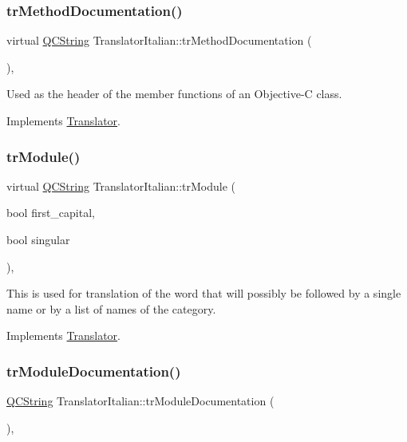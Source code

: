 \subsubsection{\texorpdfstring{trMethodDocumentation()}{trMethodDocumentation()}}
{\footnotesize\ttfamily virtual \mbox{\hyperlink{class_q_c_string}{Q\+C\+String}} Translator\+Italian\+::tr\+Method\+Documentation (\begin{DoxyParamCaption}{ }\end{DoxyParamCaption})\hspace{0.3cm}{\ttfamily [inline]}, {\ttfamily [virtual]}}

Used as the header of the member functions of an Objective-\/C class. 

Implements \mbox{\hyperlink{class_translator}{Translator}}.

\mbox{\label{class_translator_italian_aa4abaf98353a3cd4dde1fe30e1bd3f60}} 
\subsubsection{\texorpdfstring{trModule()}{trModule()}}
{\footnotesize\ttfamily virtual \mbox{\hyperlink{class_q_c_string}{Q\+C\+String}} Translator\+Italian\+::tr\+Module (\begin{DoxyParamCaption}\item[{bool}]{first\+\_\+capital,  }\item[{bool}]{singular }\end{DoxyParamCaption})\hspace{0.3cm}{\ttfamily [inline]}, {\ttfamily [virtual]}}

This is used for translation of the word that will possibly be followed by a single name or by a list of names of the category. 

Implements \mbox{\hyperlink{class_translator}{Translator}}.

\mbox{\label{class_translator_italian_a329af69d2c37dc2f4299ca6ee24442e6}} 
\subsubsection{\texorpdfstring{trModuleDocumentation()}{trModuleDocumentation()}}
{\footnotesize\ttfamily \mbox{\hyperlink{class_q_c_string}{Q\+C\+String}} Translator\+Italian\+::tr\+Module\+Documentation (\begin{DoxyParamCaption}{ }\end{DoxyParamCaption})\hspace{0.3cm}{\ttfamily [inline]}, {\ttfamily [virtual]}}

